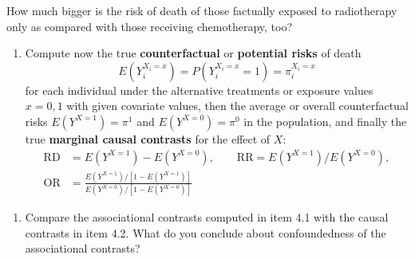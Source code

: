 \documentclass[
]{book}
\newenvironment{Shaded}{\begin{snugshade}}{\end{snugshade}}
\newcommand{\AttributeTok}[1]{\textcolor[rgb]{0.13,0.29,0.53}{#1}}
\newcommand{\DecValTok}[1]{\textcolor[rgb]{0.00,0.00,0.81}{#1}}
\newcommand{\FunctionTok}[1]{\textcolor[rgb]{0.13,0.29,0.53}{\textbf{#1}}}
\newcommand{\NormalTok}[1]{#1}
\newcommand{\OtherTok}[1]{\textcolor[rgb]{0.56,0.35,0.01}{#1}}
\newcommand{\SpecialCharTok}[1]{\textcolor[rgb]{0.81,0.36,0.00}{\textbf{#1}}}
\providecommand{\tightlist}{%
  \setlength{\itemsep}{0pt}\setlength{\parskip}{0pt}}
\begin{document}
How much bigger is the risk of death of those factually exposed to
radiotherapy only as compared with those receiving chemotherapy, too?

\begin{enumerate}
\def\labelenumi{\arabic{enumi}.}
\setcounter{enumi}{1}
\tightlist
\item
  Compute now the true \textbf{counterfactual} or
  \textbf{potential risks} of death
  \[ E(Y_i^{X_i=x}) = P(Y_i^{X_i=x}=1) = \pi_i^{X_i=x} \]
  for each
  individual under the alternative treatments or exposure values
  \(x=0,1\) with given covariate values, then the
  average or overall counterfactual risks \(E(Y^{X=1}) = \pi^1\)
  and \(E(Y^{X=0}) = \pi^0\) in the population,
  and finally the true \textbf{marginal causal contrasts}
  for the effect of \(X\):
  \[
  \begin{aligned}
   \text{RD} & = E(Y^{X=1})-E(Y^{X=0}), \qquad  \text{RR} = E(Y^{X=1})/E(Y^{X=0}), \\
   \text{OR} & = \frac{E(Y^{X=1})/[1 -  E(Y^{X=1})]}{E(Y^{X=0})/[1 -  E(Y^{X=0})] }
  \end{aligned}
  \]
\end{enumerate}

\begin{Shaded}
\end{Shaded}

\begin{enumerate}
\def\labelenumi{\arabic{enumi}.}
\setcounter{enumi}{2}
\tightlist
\item
  Compare the associational contrasts computed in
  item 4.1 with the
  causal contrasts in item 4.2. What do you conclude about
  confoundedness of the associational contrasts?
\end{enumerate}
\end{document}
